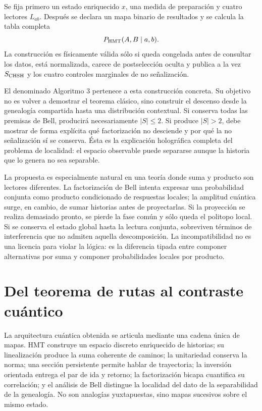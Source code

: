 \begin{construction}
Se fija primero un estado enriquecido \(x\), una medida de preparación y cuatro
lectores \(L_{ab}\). Después se declara un mapa binario de resultados y se calcula
la tabla completa
\[
  P_{\rm HMT}(A,B\mid a,b).
\]
La construcción es físicamente válida sólo si queda congelada antes de consultar
los datos, está normalizada, carece de postselección oculta y publica a la vez
\(S_{\rm CHSH}\) y los cuatro controles marginales de no señalización.
\end{construction}

El denominado Algoritmo 3 pertenece a esta construcción concreta. Su objetivo no es
volver a demostrar el teorema clásico, sino construir el descenso desde la
genealogía compartida hasta una distribución contextual. Si conserva todas las
premisas de Bell, producirá necesariamente \(|S|\leq2\). Si produce
\(|S|>2\), debe mostrar de forma explícita qué factorización no desciende y por qué
la no señalización sí se conserva. Ésta es la explicación holográfica completa del
problema de localidad: el espacio observable puede separarse aunque la historia que
lo genera no sea separable.

La propuesta es especialmente natural en una teoría donde suma y producto son
lectores diferentes. La factorización de Bell intenta expresar una probabilidad
conjunta como producto condicionado de respuestas locales; la amplitud cuántica
surge, en cambio, de sumar historias antes de proyectarlas. Si la proyección se
realiza demasiado pronto, se pierde la fase común y sólo queda el politopo local.
Si se conserva el estado global hasta la lectura conjunta, sobreviven términos de
interferencia que no admiten aquella descomposición. La incompatibilidad no es una
licencia para violar la lógica: es la diferencia tipada entre componer alternativas
por suma y componer probabilidades locales por producto.

\section{Del teorema de rutas al contraste cuántico}

La arquitectura cuántica obtenida se articula mediante una cadena única de mapas. HMT
construye un espacio discreto enriquecido de historias; su linealización produce la
suma coherente de caminos; la unitariedad conserva la norma; una sección
persistente permite hablar de trayectoria; la inversión orientada entrega el par de
ida y retorno; la factorización bicapa cuantifica su correlación; y el análisis de
Bell distingue la localidad del dato de la separabilidad de la genealogía. No son
analogías yuxtapuestas, sino mapas sucesivos sobre el mismo estado.

